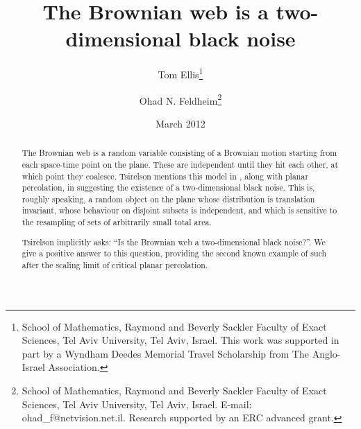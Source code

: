 \newcommand{\sigfield}{$\sigma$-field}
{
\title{The Brownian web is a two-dimensional black noise}

\newcommand{\tomthanks}{School of Mathematics, Raymond and Beverly Sackler Faculty of Exact
Sciences, Tel Aviv University, Tel Aviv, Israel.  This work was supported in part by
a Wyndham Deedes Memorial Travel Scholarship from The Anglo-Israel
Association.}

\newcommand{\ohadthanks}{School of Mathematics, Raymond and Beverly Sackler Faculty of Exact
Sciences, Tel Aviv University, Tel Aviv, Israel. E-mail:
ohad\_f@netvision.net.il. Research supported by an ERC advanced grant.}

\author{Tom Ellis\thanks{\tomthanks}\\%
\and Ohad N. Feldheim\thanks{\ohadthanks}}

\date{March 2012}

\maketitle

\begin{abstract}
The Brownian web is a random variable consisting of a Brownian motion
starting from each space-time point on the plane.  These are
independent until they hit each other, at which point they coalesce.
Tsirelson mentions this model in
\cite{tsirelson-scaling-limit-noise-stability}, along with planar
percolation, in suggesting the existence of a two-dimensional black
noise.  This is, roughly speaking, a random object on the plane whose
distribution is translation invariant, whose behaviour on disjoint
subsets is independent, and which is sensitive to the resampling of
sets of arbitrarily small total area.

Tsirelson implicitly asks: ``Is the
Brownian web a two-dimensional black noise?''.  We give a positive
answer to this question, providing the second known example of such
after the scaling limit of critical planar percolation.
\end{abstract}

}
